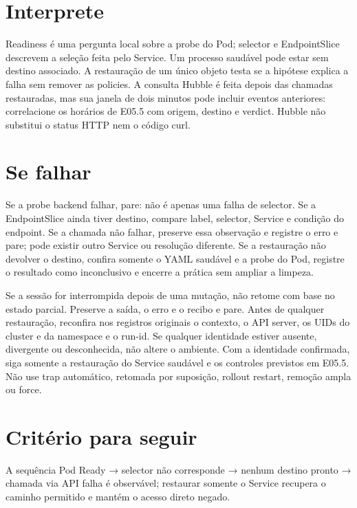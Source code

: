 \documentclass[12pt,openany,oneside,a4paper,chapter=TITLE,english,brazil]{abntex2}
\begin{document}
\section*{Interprete}\label{interprete-4}

Readiness é uma pergunta local sobre a probe do Pod; selector e EndpointSlice descrevem a seleção feita pelo Service. Um processo saudável pode estar sem destino associado. A restauração de um único objeto testa se a hipótese explica a falha sem remover as policies. A consulta Hubble é feita depois das chamadas restauradas, mas sua janela de dois minutos pode incluir eventos anteriores: correlacione os horários de E05.5 com origem, destino e verdict. Hubble não substitui o status HTTP nem o código curl.

\section*{Se falhar}\label{se-falhar-4}

Se a probe backend falhar, pare: não é apenas uma falha de selector. Se a EndpointSlice ainda tiver destino, compare label, selector, Service e condição do endpoint. Se a chamada não falhar, preserve essa observação e registre o erro e pare; pode existir outro Service ou resolução diferente. Se a restauração não devolver o destino, confira somente o YAML saudável e a probe do Pod, registre o resultado como inconclusivo e encerre a prática sem ampliar a limpeza.

Se a sessão for interrompida depois de uma mutação, não retome com base no estado parcial. Preserve a saída, o erro e o recibo e pare. Antes de qualquer restauração, reconfira nos registros originais o contexto, o API server, os UIDs do cluster e da namespace e o run-id. Se qualquer identidade estiver ausente, divergente ou desconhecida, não altere o ambiente. Com a identidade confirmada, siga somente a restauração do Service saudável e os controles previstos em E05.5. Não use trap automático, retomada por suposição, rollout restart, remoção ampla ou force.

\section*{Critério para seguir}\label{crituxe9rio-para-seguir-4}

A sequência Pod Ready → selector não corresponde → nenhum destino pronto → chamada via API falha é observável; restaurar somente o Service recupera o caminho permitido e mantém o acesso direto negado.
\end{document}
